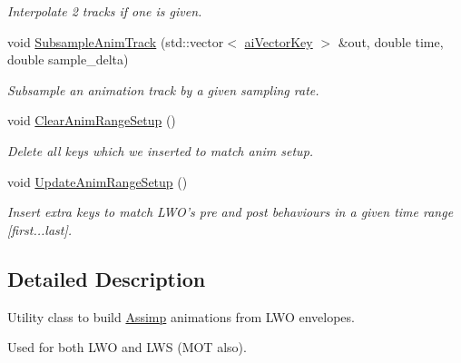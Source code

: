 \begin{DoxyCompactItemize}
\begin{DoxyCompactList}\small\item\em Interpolate 2 tracks if one is given. \end{DoxyCompactList}\item 
void \hyperlink{class_assimp_1_1_l_w_o_1_1_anim_resolver_ae22a39c212d454463abc6d1d4bf9b7f8}{Subsample\+Anim\+Track} (std\+::vector$<$ \hyperlink{structai_vector_key}{ai\+Vector\+Key} $>$ \&out, double time, double sample\+\_\+delta)
\begin{DoxyCompactList}\small\item\em Subsample an animation track by a given sampling rate. \end{DoxyCompactList}\item 
\hypertarget{class_assimp_1_1_l_w_o_1_1_anim_resolver_afc656cfa91374a770863b146177eac9e}{void \hyperlink{class_assimp_1_1_l_w_o_1_1_anim_resolver_afc656cfa91374a770863b146177eac9e}{Clear\+Anim\+Range\+Setup} ()}\label{class_assimp_1_1_l_w_o_1_1_anim_resolver_afc656cfa91374a770863b146177eac9e}

\begin{DoxyCompactList}\small\item\em Delete all keys which we inserted to match anim setup. \end{DoxyCompactList}\item 
\hypertarget{class_assimp_1_1_l_w_o_1_1_anim_resolver_acbb1ab604d71f4923ce9a8b28e5e97ec}{void \hyperlink{class_assimp_1_1_l_w_o_1_1_anim_resolver_acbb1ab604d71f4923ce9a8b28e5e97ec}{Update\+Anim\+Range\+Setup} ()}\label{class_assimp_1_1_l_w_o_1_1_anim_resolver_acbb1ab604d71f4923ce9a8b28e5e97ec}

\begin{DoxyCompactList}\small\item\em Insert extra keys to match L\+W\+O's pre and post behaviours in a given time range \mbox{[}first...last\mbox{]}. \end{DoxyCompactList}\end{DoxyCompactItemize}


\subsection{Detailed Description}
Utility class to build \hyperlink{class_assimp}{Assimp} animations from L\+W\+O envelopes. 

Used for both L\+W\+O and L\+W\+S (M\+O\+T also). 

